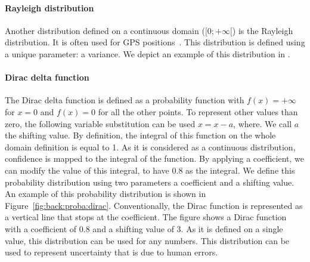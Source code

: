\paragraph{Rayleigh distribution}
Another distribution defined on a continuous domain ($[0; +\infty[$) is the Rayleigh distribution.
It is often used for GPS positions~\cite{bornholt2013abstractions}.
This distribution is defined using a unique parameter: a variance.
We depict an example of this distribution in .

\paragraph{Dirac delta function}
The Dirac delta function is defined as a probability function with $f(x) = +\infty$ for $x=0$ and $f(x) = 0$ for all the other points.
To represent other values than zero, the following variable substitution can be used $x = x - a$,  where.
We call $a$ the shifting value.
By definition, the integral of this function on the whole domain definition is equal to 1.
As it is considered as a continuous distribution, confidence is mapped to the integral of the function.
By applying a coefficient, we can modify the value of this integral, \eg to have 0.8 as the integral.
We define this probability distribution using two parameters a coefficient and a shifting value.
An example of this probability distribution is shown in Figure~\ref{fig:back:proba:dirac}.
Conventionally, the Dirac function is represented as a vertical line that stops at the coefficient.
The figure shows a Dirac function with a coefficient of 0.8 and a shifting value of 3.
As it is defined on a single value, this distribution can be used for any numbers.
This distribution can be used to represent uncertainty that is due to human errors.